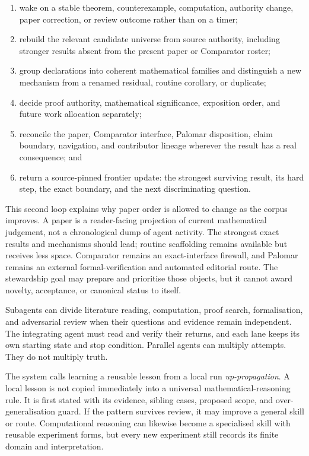\documentclass[10pt]{article}
\begin{document}
\begin{enumerate}
\item wake on a stable theorem, counterexample, computation, authority change,
      paper correction, or review outcome rather than on a timer;
\item rebuild the relevant candidate universe from source authority, including
      stronger results absent from the present paper or Comparator roster;
\item group declarations into coherent mathematical families and distinguish
      a new mechanism from a renamed residual, routine corollary, or duplicate;
\item decide proof authority, mathematical significance, exposition order,
      and future work allocation separately;
\item reconcile the paper, Comparator interface, Palomar disposition, claim
      boundary, navigation, and contributor lineage wherever the result has a
      real consequence; and
\item return a source-pinned frontier update: the strongest surviving result,
      its hard step, the exact boundary, and the next discriminating question.
\end{enumerate}

This second loop explains why paper order is allowed to change as the corpus
improves.  A paper is a reader-facing projection of current mathematical
judgement, not a chronological dump of agent activity.  The strongest exact
results and mechanisms should lead; routine scaffolding remains available but
receives less space.  Comparator remains an exact-interface firewall, and
Palomar remains an external formal-verification and automated editorial route.
The stewardship goal may prepare
and prioritise those objects, but it cannot award novelty, acceptance, or
canonical status to itself.

Subagents can divide literature reading, computation, proof search,
formalisation, and adversarial review when their questions and evidence remain
independent.  The integrating agent must read and verify their returns, and
each lane keeps its own starting state and stop condition.  Parallel agents
can multiply attempts.  They do not multiply truth.

The system calls learning a reusable lesson from a local run
\emph{up-propagation}.  A local lesson is not copied immediately into a
universal mathematical-reasoning rule.  It is first stated with its evidence,
sibling cases, proposed scope, and over-generalisation guard.  If the pattern
survives review, it may improve a general skill or route.  Computational
reasoning can likewise become a specialised skill with reusable experiment
forms, but every new experiment still records its finite domain and
interpretation.
\end{document}
